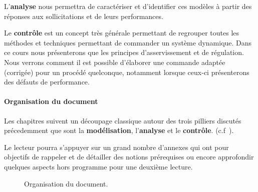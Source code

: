 L'\textbf{analyse} nous permettra de caractériser et d'identifier 
ces modèles à partir des réponses aux sollicitations et de leurs performances.

Le \textbf{contrôle} est un concept très générale permettant de regrouper
toutes les méthodes et techniques permettant de commander un système dynamique.
Dans ce cours nous présenterons que les principes d'asservissement et de 
régulation. Nous verrons comment il est possible d'élaborer une commande 
adaptée (corrigée) pour un procédé quelconque, notamment lorsque ceux-ci 
présenterons des défauts de performance.


\paragraph{Organisation du document}
Les chapitres suivent un découpage classique autour des trois pilliers 
discutés précedemment que sont la \textbf{modélisation}, l'\textbf{analyse} 
et le \textbf{contrôle}. (c.f~).

Le lecteur pourra s'appuyer sur un grand nombre d'annexes qui ont pour 
objectifs de rappeler et de détailler des notions prérequises ou encore 
approfondir quelques aspects hors programme pour une deuxième lecture.

\begin{figure}[!h]
\renewcommand\thefigure{A}
\begin{center}
{
\tikzset{external/export=false}

}
\end{center}
\caption{Organisation du document.\label{fig-diagramme_cours}}
\end{figure}
